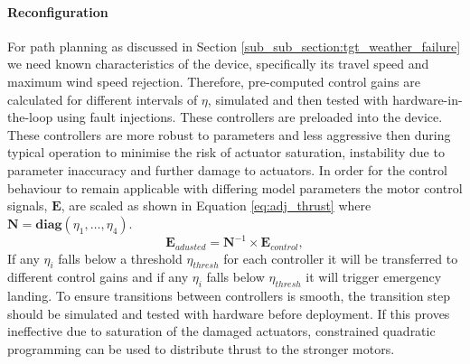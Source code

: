 \paragraph{Reconfiguration}
For path planning as discussed in Section \ref{sub_sub_section:tgt_weather_failure} we need known characteristics of the device, specifically its travel speed and maximum wind speed rejection. Therefore, pre-computed control gains are calculated for different intervals of $\eta$, simulated and then tested with hardware-in-the-loop using fault injections. These controllers are preloaded into the device. These controllers are more robust to parameters and less aggressive then during typical operation to minimise the risk of actuator saturation, instability due to parameter inaccuracy and further damage to actuators. In order for the control behaviour to remain applicable with differing model parameters the motor control signals, $\mathbf{E}$, are scaled as shown in Equation \ref{eq:adj_thrust} where $\mathbf{N} = \mathbf{diag}(\eta_1, \dots,\eta_4)$.
\begin{equation}\label{eq:adj_thrust}
    \mathbf{E}_{adusted} = \mathbf{N}^{-1}\times \mathbf{E}_{control}, 
\end{equation}
If any $\eta_i$ falls below a threshold $\eta_{thresh}$ for each controller it will be transferred to different control gains and if any $\eta_i$ falls below $\eta_{thresh}$ it will trigger emergency landing. To ensure transitions between controllers is smooth, the transition step should be simulated and tested with hardware before deployment. If this proves ineffective due to saturation of the damaged actuators, constrained quadratic programming can be used \cite{JOHANSEN2013} to distribute thrust to the stronger motors.

